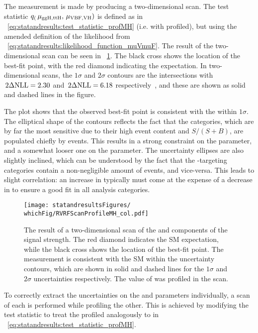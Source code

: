 The measurement is made by producing a two-dimensional \DNLL scan. The test statistic $q_(\,\mu_{\text{ggH},\text{ttH}},\,\mu_{\text{VBF},\text{VH}})$ is defined as in \Eq~\ref{eq:statandresults:test_statistic_profMH} (i.e. with \mH profiled), but using the amended definition of the likelihood from \Eq~\ref{eq:statandresults:likelihood_function_muVmuF}. 
The result of the two-dimensional scan can be seen in \Fig~\ref{fig:statandresults:mu_per_rvrf}. 
The black cross shows the location of the best-fit point, with the red diamond indicating the \SM expectation. In two-dimensional \DNLL scans, the $1\sigma$ and $2\sigma$ contours are the intersections with $\,2\Delta\text{NLL}=2.30$ and $\,2\Delta\text{NLL}=6.18$ respectively~\cite{Cowan}, and these are shown as solid and dashed lines in the figure. 

The plot shows that the observed best-fit point is consistent with the \SM within $1\sigma$. The elliptical shape of the contours reflects the fact that the \Untagged categories, which are by far the most sensitive due to their high event content and $S/(S+B)$, are populated chiefly by \ggH events. This results in a strong constraint on the \muF parameter, and a somewhat looser one on the \muV parameter. The uncertainty ellipses are also slightly inclined, which can be understood by the fact that the \VBF-targeting categories contain a non-negligible amount of \ggH events, and vice-versa. This leads to slight correlation: an increase in \muF typically must come at the expense of a decrease in \muV to ensure a good fit in all analysis categories.


\begin{figure}[ht!]
\centering
\texttt{[image: statandresultsFigures/\\whichFig/RVRFScanProfileMH\_col.pdf]} 
\caption{The result of a two-dimensional \DNLL scan of the \muF and \muV components of the signal strength. The red diamond indicates the SM expectation, while the black cross shows the location of the best-fit point. The measurement is consistent with the SM within the uncertainty contours, which are shown in solid and dashed lines for the $1\sigma$ and $2\sigma$ uncertainties respectively. The value of \mH was profiled in the scan.}

\label{fig:statandresults:mu_per_rvrf}
\end{figure}

To correctly extract the uncertainties on  the \muF and \muV parameters individually, a \DNLL scan of each is performed while profiling the other. This is achieved by modifying the test statistic to treat the profiled \POI analogously to \mH in \Eq~\ref{eq:statandresults:test_statistic_profMH}. 

